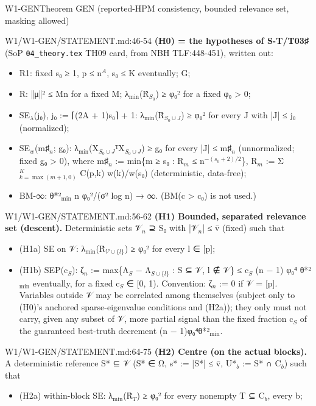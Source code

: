\begin{card}{W1-GEN}{Theorem GEN (reported-HPM consistency, bounded relevance set, masking allowed)}
\begin{stmt}{W1/W1-GEN/STATEMENT.md:46-54}
\textbf{(H0) = the hypotheses of S-T/T03♯} (SoP \texttt{04\_theory.tex} TH09 card, from NBH TLF:448-451), written out:
\begin{itemize}
\item R1: fixed s₀ ≥ 1, p ≤ n$^{A}$, s₀ ≤ K eventually; G;
\item R: ‖μ‖² ≤ Mn for a fixed M; λ$_{\mathrm{min}}$(R̂$_{S_0}$) ≥ φ₀² for a fixed φ₀ > 0;
\item SE$_{\lambda}$(j₀), j₀ := ⌈(2A + 1)s₀⌉ + 1: λ$_{\mathrm{min}}$(R̂$_{S_0\cup J}$) ≥ φ₀² for every J with |J| ≤ j₀ (normalized);
\item SE$_{w}$(m♯$_{n}$; g₀): λ$_{\mathrm{min}}$(X$_{S_0\cup J}$ᵀX$_{S_0\cup J}$) ≥ g₀ for every |J| ≤ m♯$_{n}$ (unnormalized; fixed g₀ > 0), where
m♯$_{n}$ := min\{m ≥ s₀ : R$_{m}$ ≤ n$^{-(s_0+2)/2}$\}, R$_{m}$ := Σ$_{k=\max(m+1,0)}^{K}$ C(p,k) w(k)/w(s₀) (deterministic, data-free);
\item BM-∞: θ*²$_{\mathrm{min}}$ n φ₀²/(σ² log n) → ∞. (BM(c > c₀) is not used.)
\end{itemize}
\end{stmt}
\begin{stmt}{W1/W1-GEN/STATEMENT.md:56-62}
\textbf{(H1) Bounded, separated relevance set (descent).} Deterministic sets 𝒱$_{n}$ ⊇ S₀ with |𝒱$_{n}$| ≤ v̄ (fixed) such that
\begin{itemize}
\item (H1a) SE on 𝒱: λ$_{\mathrm{min}}$(R̂$_{\mathcal{V}\cup\{l\}}$) ≥ φ₀² for every l ∈ [p];
\item (H1b) SEP(c$_{S}$): ζ$_{n}$ := max\{Λ$_{S}$ − Λ$_{S\cup\{l\}}$ : S ⊆ 𝒱, l ∉ 𝒱\} ≤ c$_{S}$ (n − 1) φ₀⁴ θ*²$_{\mathrm{min}}$ eventually, for a fixed
c$_{S}$ ∈ [0, 1). Convention: ζ$_{n}$ := 0 if 𝒱 = [p].
Variables outside 𝒱 may be correlated among themselves (subject only to (H0)'s anchored sparse-eigenvalue
conditions and (H2a)); they only must not carry, given any subset of
𝒱, more partial signal than the fixed fraction c$_{S}$ of the guaranteed best-truth decrement (n − 1)φ₀⁴θ*²$_{\mathrm{min}}$.
\end{itemize}
\end{stmt}
\begin{stmt}{W1/W1-GEN/STATEMENT.md:64-75}
\textbf{(H2) Centre (on the actual blocks).} A deterministic reference S* ⊆ 𝒱 (S* ∈ Ω, s* := |S*| ≤ v̄,
U*$_{b}$ := S* ∩ C$_{b}$) such that
\begin{itemize}
\item (H2a) within-block SE: λ$_{\mathrm{min}}$(R̂$_{T}$) ≥ φ₀² for every nonempty T ⊆ C$_{b}$, every b;

\end{itemize}
\end{stmt}
\end{card}
